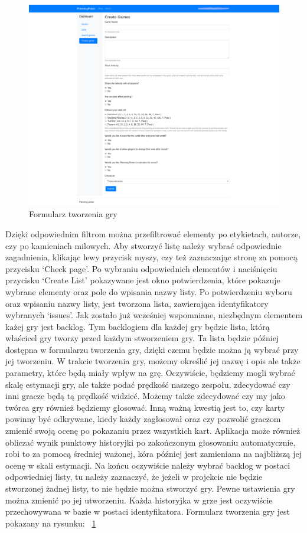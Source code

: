 \begin{figure}
	\centering\includegraphics[width=.7\textwidth]{img/Formularz}
	\caption{Formularz tworzenia gry}\label{rys:form}%
\end{figure}
Dzięki odpowiednim filtrom można przefiltrować elementy po etykietach, autorze, czy po kamieniach milowych.
Aby stworzyć listę należy wybrać odpowiednie zagadnienia,
klikając lewy przycisk myszy, czy też zaznaczając stronę za pomocą przycisku `Check page'.
Po wybraniu odpowiednich elementów i naciśnięciu przycisku `Create List' pokazywane jest okno potwierdzenia,
które pokazuje wybrane elementy oraz pole do wpisania nazwy listy.
Po potwierdzeniu wyboru oraz wpisaniu nazwy listy, jest tworzona lista, zawierająca identyfikatory wybranych `issues'.
Jak zostało już wcześniej wspomniane, niezbędnym elementem każej gry jest backlog.
Tym backlogiem dla każdej gry będzie lista, którą właścicel gry tworzy przed każdym stworzeniem gry.
Ta lista będzie później dostępna w formularzu tworzenia gry,
dzięki czemu będzie można ją wybrać przy jej tworzeniu.
W trakcie tworzenia gry, możemy określić jej nazwę i opis ale także parametry, które będą miały wpływ na grę.
Oczywiście, będziemy mogli wybrać skalę estymacji gry, ale także podać prędkość naszego zespołu,
zdecydować czy inni gracze będą tą prędkość widzieć.
Możemy także zdecydować czy my jako twórca gry również będziemy głosować.
Inną ważną kwestią jest to, czy karty powinny być odkrywane, kiedy każdy zagłosował
oraz czy pozwolić graczom zmienić swoją ocenę po pokazaniu przez wszystkich kart.
Aplikacja może również obliczać wynik punktowy historyjki po zakończonym głosowaniu automatycznie,
robi to za pomocą średniej ważonej, kóra później jest zamieniana na najbliższą jej ocenę w skali estymacji.
Na końcu oczywiście należy wybrać backlog w postaci odpowiedniej listy, tu należy zaznaczyć,
że jeżeli w projekcie nie będzie stworzonej żadnej listy, to nie będzie można stworzyć gry.
Pewne ustawienia gry można zmienić po jej utworzeniu.
Każda historyjka w grze jest oczywiście przechowywana w bazie w postaci identyfikatora.
Formularz tworzenia gry jest pokazany na rysunku: 
~\ref{rys:form} 

